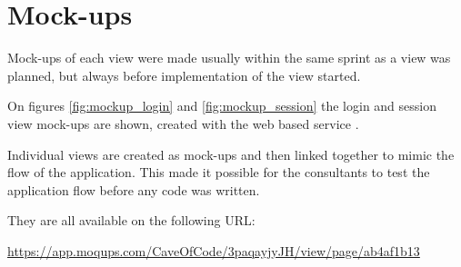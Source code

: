 \section{Mock-ups}
Mock-ups of each view were made usually within the same sprint as a view was planned, but always before implementation of the view started.

On figures \ref{fig:mockup_login} and \ref{fig:mockup_session} the login and session view mock-ups are shown, created with the web based service .

Individual views are created as mock-ups and then linked together to mimic the flow of the application. 
This made it possible for the consultants to test the application flow before any code was written.

They are all available on the following URL: 

\url{https://app.moqups.com/CaveOfCode/3paqayjyJH/view/page/ab4af1b13}


